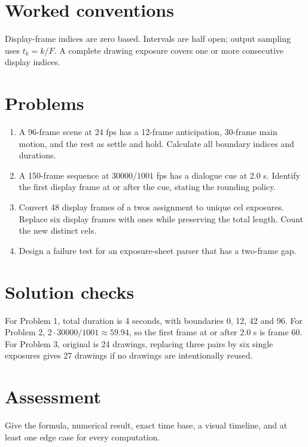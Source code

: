 \documentclass[10pt,letterpaper]{article}
\begin{document}
\makedoctitle
\makedocsummary

\section{Worked conventions}
Display-frame indices are zero based. Intervals are half open; output sampling uses $t_k=k/F$. A complete drawing exposure covers one or more consecutive display indices.
\section{Problems}
\begin{enumerate}
\item A 96-frame scene at 24 fps has a 12-frame anticipation, 30-frame main motion, and the rest as settle and hold. Calculate all boundary indices and durations.
\item A 150-frame sequence at $30000/1001$ fps has a dialogue cue at 2.0 s. Identify the first display frame at or after the cue, stating the rounding policy.
\item Convert 48 display frames of a twos assignment to unique cel exposures. Replace six display frames with ones while preserving the total length. Count the new distinct cels.
\item Design a failure test for an exposure-sheet parser that has a two-frame gap.
\end{enumerate}
\section{Solution checks}
For Problem 1, total duration is 4 seconds, with boundaries 0, 12, 42 and 96. For Problem 2, $2\cdot30000/1001\approx59.94$, so the first frame at or after 2.0 s is frame 60. For Problem 3, original is 24 drawings, replacing three pairs by six single exposures gives 27 drawings if no drawings are intentionally reused.
\section{Assessment}
Give the formula, numerical result, exact time base, a visual timeline, and at least one edge case for every computation.
\end{document}
